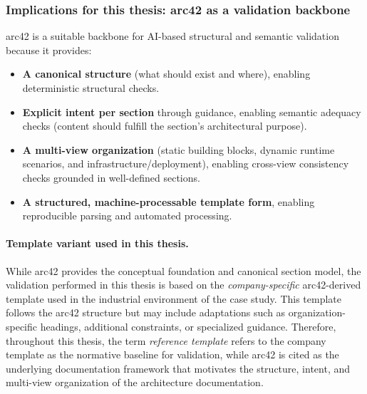 \subsubsection{Implications for this thesis: arc42 as a validation backbone}
arc42 is a suitable backbone for AI-based structural and semantic validation because it provides:
\begin{itemize}
    \item \textbf{A canonical structure} (what should exist and where), enabling deterministic structural checks.
    \item \textbf{Explicit intent per section} through guidance, enabling semantic adequacy checks (content should fulfill the section’s architectural purpose).
    \item \textbf{A multi-view organization} (static building blocks, dynamic runtime scenarios, and infrastructure/deployment), enabling cross-view consistency checks grounded in well-defined sections.
    \item \textbf{A structured, machine-processable template form}, enabling reproducible parsing and automated processing.
\end{itemize}

\paragraph{Template variant used in this thesis.}
While arc42 provides the conceptual foundation and canonical section model, the validation performed in this thesis is based on the \emph{company-specific} arc42-derived template used in the industrial environment of the case study. This template follows the arc42 structure but may include adaptations such as organization-specific headings, additional constraints, or specialized guidance. Therefore, throughout this thesis, the term \emph{reference template} refers to the company template as the normative baseline for validation, while arc42 is cited as the underlying documentation framework that motivates the structure, intent, and multi-view organization of the architecture documentation.
